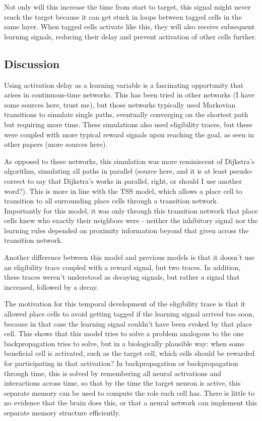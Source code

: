 \documentclass{article}
\begin{document}
Not only will this increase the time from start to target, this signal might never reach the target because it can get stuck in loops between tagged cells in the same layer. When tagged cells activate like this, they will also receive subsequent learning signals, reducing their delay and prevent activation of other cells further.

\subsection{Discussion}
Using activation delay as a learning variable is a fascinating opportunity that arises in continuous-time networks. This has been tried in other networks (I have some sources here, trust me), but those networks typically used Markovian transitions  to simulate single paths, eventually converging on the shortest path but requiring more time. These simulations also used eligibility traces, but these were coupled with more typical reward signals upon reaching the goal, as seen in other papers (more sources here).

As opposed to these networks, this simulation was more reminiscent of Dijkstra's algorithm, simulating all paths in parallel (source here, and it is at least pseudo-correct to say that Dijkstra's works in parallel, right, or should I use another word?). This is more in line with the TSS model, which allows a place cell to transition to all surrounding place cells through a transition network. Importantly for this model, it was only through this transition network that place cells knew who exactly their neighbors were - neither the inhibitory signal nor the learning rules depended on proximity information beyond that given across the transition network.

Another difference between this model and previous models is that it doesn't use an eligibility trace coupled with a reward signal, but two traces. In addition, these traces weren't understood as decaying signals, but rather a signal that increased, followed by a decay.

The motivation for this temporal development of the eligibility trace is that it allowed place cells to avoid getting tagged if the learning signal arrived too soon, because in that case the learning signal couldn't have been evoked by that place cell. This shows that this model tries to solve a problem analogous to the one backpropagation tries to solve, but in a biologically plausible way: when some beneficial cell is activated, such as the target cell, which cells should be rewarded for participating in that activation?
In backpropagation or backpropagation through time, this is solved by remembering all neural activations and interactions across time, so that by the time the target neuron is active, this separate memory can be used to compute the role each cell has. There is little to no evidence that the brain does this, or that a neural network can implement this separate memory structure efficiently. 
\end{document}
